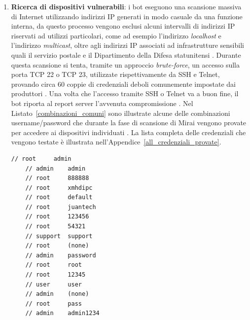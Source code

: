\begin{enumerate}
    \item \textbf{Ricerca di dispositivi vulnerabili}: i bot eseguono una scansione massiva di Internet utilizzando indirizzi IP generati in modo casuale da una funzione interna, da questo processo vengono esclusi alcuni intervalli di indirizzi IP  riservati ad utilizzi particolari, come ad esempio l'indirizzo \emph{localhost} e l'indirizzo \emph{multicast}, oltre agli indirizzi IP associati ad infrastrutture sensibili quali il servizio postale e il Dipartimento della Difesa statunitensi \cite{attacchi_mirai}. Durante questa scansione si tenta, tramite un approccio \emph{brute-force}, un accesso sulla porta TCP 22 o TCP 23, utilizzate rispettivamente da SSH e Telnet, provando circa 60 coppie di credenziali deboli comunemente impostate dai produttori \cite{attacchi_mirai}. Una volta che l'accesso tramite SSH o Telnet va a buon fine, il bot riporta al report server l'avvenuta compromissione \cite{attacchi_mirai}. Nel Listato~\ref{combinazioni_comuni} sono illustrate alcune delle combinazioni username/password che durante la fase di scansione di Mirai vengono provate per accedere ai dispositivi individuati \cite{mirai_password_provate}. La lista completa delle credenziali che vengono testate è illustrata nell'Appendice~\ref{all_credenziali_provate}.
    \begin{lstlisting}[caption={Alcune combinazioni username/password provate.}, label={combinazioni_comuni}]
    // root     admin
    // admin    admin
    // root     888888
    // root     xmhdipc
    // root     default
    // root     juantech
    // root     123456
    // root     54321
    // support  support
    // root     (none)
    // admin    password
    // root     root
    // root     12345
    // user     user
    // admin    (none)
    // root     pass
    // admin    admin1234
    \end{lstlisting}


\end{enumerate}
